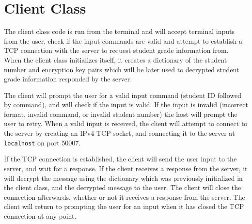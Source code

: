 \section*{Client Class}
The client class code is run from the terminal and will accept terminal inputs from the user, check if the input commands are valid and attempt to establish a TCP connection with the server to request student grade information from. When the client class initializes itself, it creates a dictionary of the student number and encryption key pairs which will be later used to decrypted student grade information responded by the server.

The client will prompt the user for a valid input command (student ID followed by command), and will check if the input is valid. If the input is invalid (incorrect format, invalid command, or invalid student number) the host will prompt the user to retry. When a valid input is received, the client will attempt to connect to the server by creating an IPv4 TCP socket, and connecting it to the server at \texttt{localhost} on port 50007.

If the TCP connection is established, the client will send the user input to the server, and wait for a response. If the client receives a response from the server, it will decrypt the message using the dictionary which was previously initialized in the client class, and the decrypted message to the user. The client will close the connection afterwards, whether or not it receives a response from the server. The client will return to prompting the user for an input when it has closed the TCP connection at any point.

